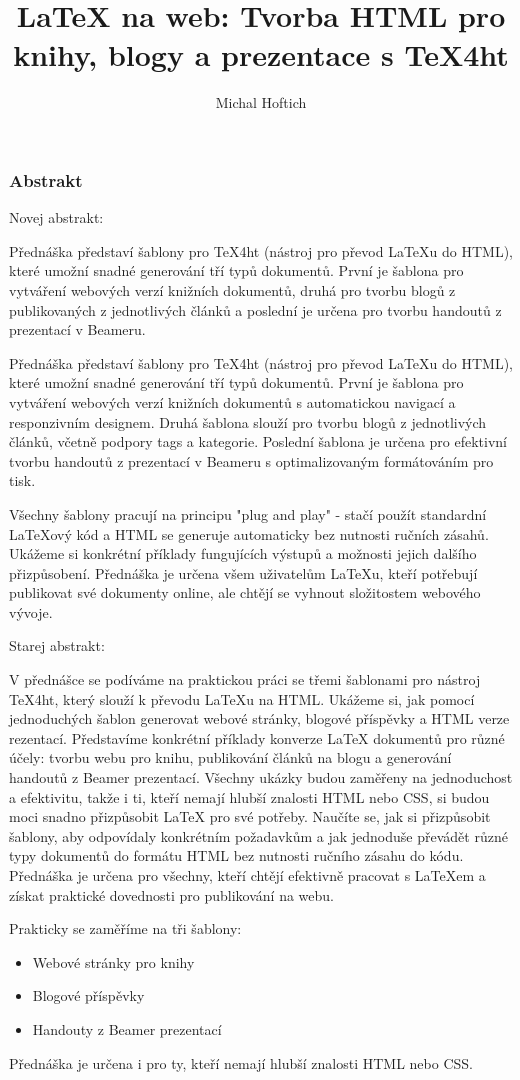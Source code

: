 \documentclass{beamer}
\title{LaTeX na web: Tvorba HTML pro knihy, blogy a prezentace s TeX4ht}
\author{Michal Hoftich}
\date{}
\begin{document}
\frame{\titlepage}

\begin{frame}
\frametitle{Abstrakt}

Novej abstrakt:

Přednáška představí šablony pro TeX4ht (nástroj pro převod LaTeXu do HTML), které umožní snadné generování tří typů dokumentů. První je
šablona pro vytváření webových verzí knižních dokumentů, druhá pro tvorbu blogů z publikovaných z jednotlivých článků a poslední je určena 
pro tvorbu handoutů z prezentací v Beameru.

Přednáška představí šablony pro TeX4ht (nástroj pro převod LaTeXu do HTML), které umožní snadné generování tří typů dokumentů. První je šablona pro vytváření webových verzí knižních dokumentů s automatickou navigací a responzivním designem. Druhá šablona slouží pro tvorbu blogů z jednotlivých článků, včetně podpory tags a kategorie. Poslední šablona je určena pro efektivní tvorbu handoutů z prezentací v Beameru s optimalizovaným formátováním pro tisk.

Všechny šablony pracují na principu "plug and play" - stačí použít standardní LaTeXový kód a HTML se generuje automaticky bez nutnosti ručních zásahů. Ukážeme si konkrétní příklady fungujících výstupů a možnosti jejich dalšího přizpůsobení. Přednáška je určena všem uživatelům LaTeXu, kteří potřebují publikovat své dokumenty online, ale chtějí se vyhnout složitostem webového vývoje.


Starej abstrakt:

V přednášce se podíváme na praktickou práci se třemi šablonami pro nástroj
TeX4ht, který slouží k převodu LaTeXu na HTML. Ukážeme si, jak pomocí
jednoduchých šablon generovat webové stránky, blogové příspěvky a HTML verze
rezentací. Představíme konkrétní příklady konverze LaTeX dokumentů pro různé
účely: tvorbu webu pro knihu, publikování článků na blogu a generování handoutů
z Beamer prezentací. Všechny ukázky budou zaměřeny na jednoduchost a
efektivitu, takže i ti, kteří nemají hlubší znalosti HTML nebo CSS, si budou
moci snadno přizpůsobit LaTeX pro své potřeby. Naučíte se, jak si přizpůsobit
šablony, aby odpovídaly konkrétním požadavkům a jak jednoduše převádět různé
typy dokumentů do formátu HTML bez nutnosti ručního zásahu do kódu. Přednáška
je určena pro všechny, kteří chtějí efektivně pracovat s LaTeXem a získat
praktické dovednosti pro publikování na webu.

Prakticky se zaměříme na tři šablony:
\begin{itemize}
    \item Webové stránky pro knihy
    \item Blogové příspěvky
    \item Handouty z Beamer prezentací
\end{itemize}
Přednáška je určena i pro ty, kteří nemají hlubší znalosti HTML nebo CSS.
\end{frame}
\end{document}
